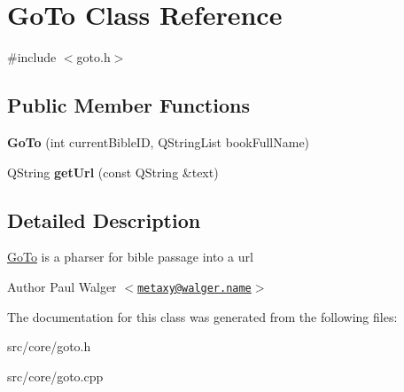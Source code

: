 \hypertarget{classGoTo}{
\section{GoTo Class Reference}
\label{classGoTo}
}


{\ttfamily \#include $<$goto.h$>$}

\subsection*{Public Member Functions}
\begin{DoxyCompactItemize}
\item 
\hypertarget{classGoTo_af65860fd8cbfde047a2ac0b848c08ccb}{
{\bfseries GoTo} (int currentBibleID, QStringList bookFullName)}
\label{classGoTo_af65860fd8cbfde047a2ac0b848c08ccb}

\item 
\hypertarget{classGoTo_abeb80d20c63ea781fb6426690b11a8c1}{
QString {\bfseries getUrl} (const QString \&text)}
\label{classGoTo_abeb80d20c63ea781fb6426690b11a8c1}

\end{DoxyCompactItemize}


\subsection{Detailed Description}
\hyperlink{classGoTo}{GoTo} is a pharser for bible passage into a url

\begin{DoxyAuthor}{Author}
Paul Walger $<$\href{mailto:metaxy@walger.name}{\tt metaxy@walger.name}$>$ 
\end{DoxyAuthor}


The documentation for this class was generated from the following files:\begin{DoxyCompactItemize}
\item 
src/core/goto.h\item 
src/core/goto.cpp\end{DoxyCompactItemize}
